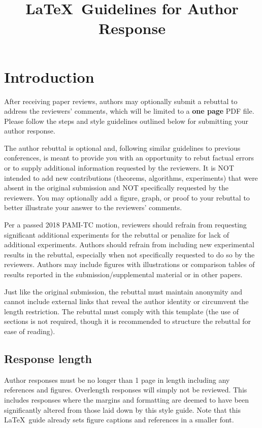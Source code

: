 \documentclass[10pt,twocolumn,letterpaper]{article}
\begin{document}
\title{\LaTeX\ Guidelines for Author Response}  %

\maketitle
\thispagestyle{empty}
\appendix

\section{Introduction}

After receiving paper reviews, authors may optionally submit a rebuttal to address the reviewers' comments, which will be limited to a {\bf one page} PDF file.
Please follow the steps and style guidelines outlined below for submitting your author response.

The author rebuttal is optional and, following similar guidelines to previous conferences, is meant to provide you with an opportunity to rebut factual errors or to supply additional information requested by the reviewers.
It is NOT intended to add new contributions (theorems, algorithms, experiments) that were absent in the original submission and NOT specifically requested by the reviewers.
You may optionally add a figure, graph, or proof to your rebuttal to better illustrate your answer to the reviewers' comments.

Per a passed 2018 PAMI-TC motion, reviewers should refrain from requesting significant additional experiments for the rebuttal or penalize for lack of additional experiments.
Authors should refrain from including new experimental results in the rebuttal, especially when not specifically requested to do so by the reviewers.
Authors may include figures with illustrations or comparison tables of results reported in the submission/supplemental material or in other papers.

Just like the original submission, the rebuttal must maintain anonymity and cannot include external links that reveal the author identity or circumvent the length restriction.
The rebuttal must comply with this template (the use of sections is not required, though it is recommended to structure the rebuttal for ease of reading).


\subsection{Response length}
Author responses must be no longer than 1 page in length including any references and figures.
Overlength responses will simply not be reviewed.
This includes responses where the margins and formatting are deemed to have been significantly altered from those laid down by this style guide.
Note that this \LaTeX\ guide already sets figure captions and references in a smaller font.
\end{document}
